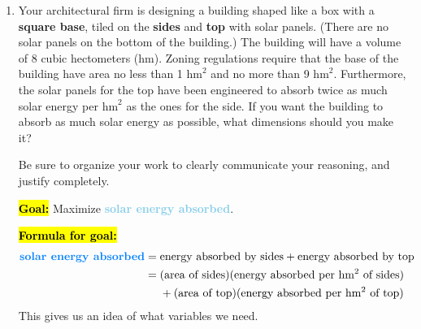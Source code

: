\documentclass{article}
\newcommand{\highlight}[1]{\boldmath\hl{\textbf{#1}}\unboldmath}
\newcommand{\goal}[1]{\textbf{\textcolor{skyblue}{#1}}}
\theoremstyle{theorem}
\begin{document}
\begin{enumerate}
\begin{enumerate}
    \begin{solution}
      From our calculation in (b), at the current production level of 9 liters of vaccine per week, we expect the profit to change by $-9$ hundred dollars per liter of vaccine. So, if they increase production by $0.1$ liters, we expect their profit to change by
      \[ \approx (-9 \text{ hundred dollars per liter})(0.1 \text{ liters}) = -0.9 \text{ hundred dollars}.\] In other words, we expect their profit to . 
    \end{solution}

  \end{enumerate}

\item \label{fall2012-1a-midterm2-6a}  \finishexam 

  \begin{problem}[\newpage]
    Your architectural firm is designing a building shaped like a box with a \textbf{square base}, tiled on the \textbf{sides} and \textbf{top} with solar panels. (There are no solar panels on the bottom of the building.) The building will have a volume of 8 cubic hectometers (hm). Zoning regulations require that the base of the building have area no less than 1 $\text{hm}^2$ and no more than 9 $\text{hm}^2$. Furthermore, the solar panels for the top have been engineered to absorb twice as much solar energy per $\text{hm}^2$ as the ones for the side. If you want the building to absorb as much solar energy as possible, what dimensions should you make it?

    Be sure to organize your work to clearly communicate your reasoning, and justify completely. 
  \end{problem}  

  \begin{solution}
    \highlight{Goal:} Maximize \goal{solar energy absorbed}.

    \highlight{Formula for goal:} 
    \begin{align}
      \text{\goal{solar energy absorbed}} = {} & \text{energy absorbed by sides} + \text{energy absorbed by top} \nonumber \\
      = {} & \text{(area of sides)(energy absorbed per hm$^2$ of sides)} \nonumber \\
      & + \text{(area of top)(energy absorbed per hm$^2$ of top)} \label{eq:fall2012-1a-midterm2-6a-energy}
    \end{align}
    This gives us an idea of what variables we need.


\end{solution}
\end{enumerate}
\end{document}
